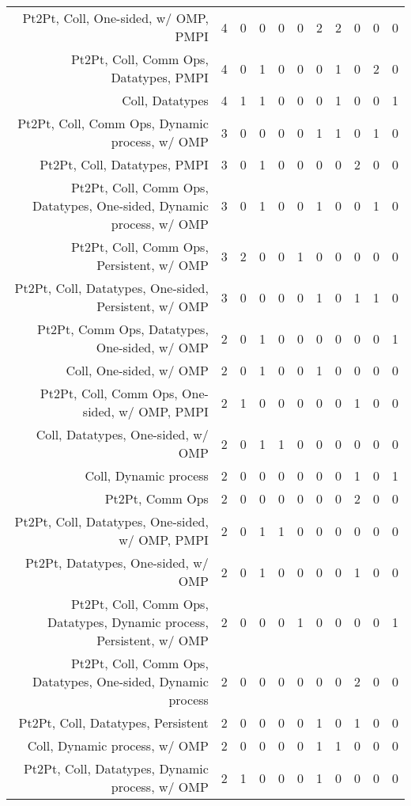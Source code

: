 {\begin{landscape}
\begin{longtable}[htb]{r|c|c|c|c|c|c|c|c|c|c}
{Pt2Pt, Coll, One-sided, w/ OMP, PMPI} & 4 & 0 & 0 & 0 & 0 & 2 & 2 & 0 & 0 & 0 \\%
{Pt2Pt, Coll, Comm Ops, Datatypes, PMPI} & 4 & 0 & 1 & 0 & 0 & 0 & 1 & 0 & 2 & 0 \\%
{Coll, Datatypes} & 4 & 1 & 1 & 0 & 0 & 0 & 1 & 0 & 0 & 1 \\%
{Pt2Pt, Coll, Comm Ops, Dynamic process, w/ OMP} & 3 & 0 & 0 & 0 & 0 & 1 & 1 & 0 & 1 & 0 \\%
{Pt2Pt, Coll, Datatypes, PMPI} & 3 & 0 & 1 & 0 & 0 & 0 & 0 & 2 & 0 & 0 \\%
{Pt2Pt, Coll, Comm Ops, Datatypes, One-sided, Dynamic process, w/ OMP} & 3 & 0 & 1 & 0 & 0 & 1 & 0 & 0 & 1 & 0 \\%
{Pt2Pt, Coll, Comm Ops, Persistent, w/ OMP} & 3 & 2 & 0 & 0 & 1 & 0 & 0 & 0 & 0 & 0 \\%
{Pt2Pt, Coll, Datatypes, One-sided, Persistent, w/ OMP} & 3 & 0 & 0 & 0 & 0 & 1 & 0 & 1 & 1 & 0 \\%
{Pt2Pt, Comm Ops, Datatypes, One-sided, w/ OMP} & 2 & 0 & 1 & 0 & 0 & 0 & 0 & 0 & 0 & 1 \\%
{Coll, One-sided, w/ OMP} & 2 & 0 & 1 & 0 & 0 & 1 & 0 & 0 & 0 & 0 \\%
{Pt2Pt, Coll, Comm Ops, One-sided, w/ OMP, PMPI} & 2 & 1 & 0 & 0 & 0 & 0 & 0 & 1 & 0 & 0 \\%
{Coll, Datatypes, One-sided, w/ OMP} & 2 & 0 & 1 & 1 & 0 & 0 & 0 & 0 & 0 & 0 \\%
{Coll, Dynamic process} & 2 & 0 & 0 & 0 & 0 & 0 & 0 & 1 & 0 & 1 \\%
{Pt2Pt, Comm Ops} & 2 & 0 & 0 & 0 & 0 & 0 & 0 & 2 & 0 & 0 \\%
{Pt2Pt, Coll, Datatypes, One-sided, w/ OMP, PMPI} & 2 & 0 & 1 & 1 & 0 & 0 & 0 & 0 & 0 & 0 \\%
{Pt2Pt, Datatypes, One-sided, w/ OMP} & 2 & 0 & 1 & 0 & 0 & 0 & 0 & 1 & 0 & 0 \\%
{Pt2Pt, Coll, Comm Ops, Datatypes, Dynamic process, Persistent, w/ OMP} & 2 & 0 & 0 & 0 & 1 & 0 & 0 & 0 & 0 & 1 \\%
{Pt2Pt, Coll, Comm Ops, Datatypes, One-sided, Dynamic process} & 2 & 0 & 0 & 0 & 0 & 0 & 0 & 2 & 0 & 0 \\%
{Pt2Pt, Coll, Datatypes, Persistent} & 2 & 0 & 0 & 0 & 0 & 1 & 0 & 1 & 0 & 0 \\%
{Coll, Dynamic process, w/ OMP} & 2 & 0 & 0 & 0 & 0 & 1 & 1 & 0 & 0 & 0 \\%
{Pt2Pt, Coll, Datatypes, Dynamic process, w/ OMP} & 2 & 1 & 0 & 0 & 0 & 1 & 0 & 0 & 0 & 0 \\%

\end{longtable}
\end{landscape}}
